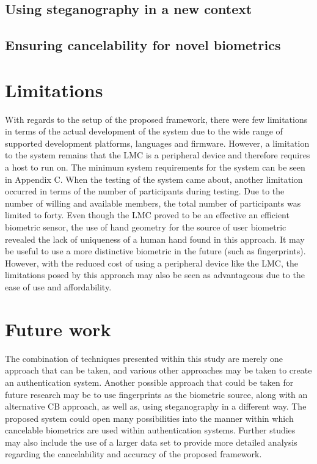 \subsection{Using steganography in a new context}

\subsection{Ensuring cancelability for novel biometrics}

\section{Limitations}

With regards to the setup of the proposed framework, there were few limitations in terms of the actual development of the system due to the wide range of supported development platforms, languages and firmware. However, a limitation to the system remains that the LMC is a peripheral device and therefore requires a host to run on. The minimum system requirements for the system can be seen in Appendix C.
When the testing of the system came about, another limitation occurred in terms of the number of participants during testing. Due to the number of willing and available members, the total number of participants was limited to forty. 
Even though the LMC proved to be an effective an efficient biometric sensor, the use of hand geometry for the source of user biometric revealed the lack of uniqueness of a human hand found in this approach. It may be useful to use a more distinctive biometric in the future (such as fingerprints). However, with the reduced cost of using a peripheral device like the LMC, the limitations posed by this approach may also be seen as advantageous due to the ease of use and affordability.

\section{Future work}

The combination of techniques presented within this study are merely one approach that can be taken, and various other approaches may be taken to create an authentication system. Another possible approach that could be taken for future research may be to use fingerprints as the biometric source, along with an alternative CB approach, as well as, using steganography in a different way. The proposed system could open many possibilities into the manner within which cancelable biometrics are used within authentication systems.
Further studies may also include the use of a larger data set to provide more detailed analysis regarding the cancelability and accuracy of the proposed framework.


